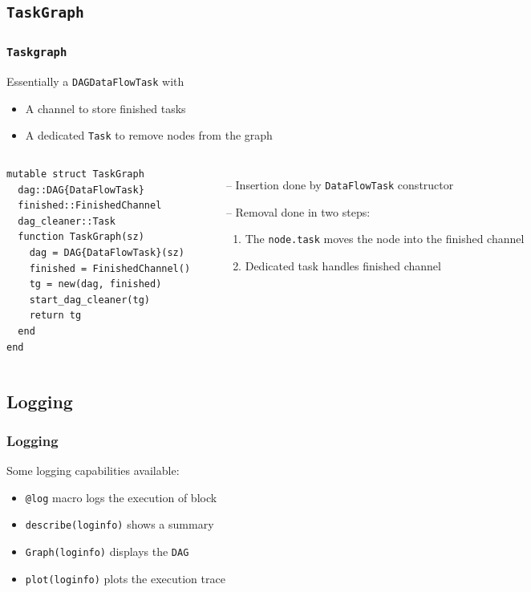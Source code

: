 \documentclass{beamer}
\begin{document}
\subsection{\texttt{TaskGraph}}

\begin{frame}[fragile]
\frametitle{{\texttt{Taskgraph}}}  
  
Essentially a \texttt{DAG{DataFlowTask}} with
\begin{itemize}
  \item A channel to store finished tasks  
  \item A dedicated \texttt{Task} to remove nodes from the graph
\end{itemize}

\hrulefill

\begin{columns}

\begin{verbatim}
mutable struct TaskGraph
  dag::DAG{DataFlowTask}
  finished::FinishedChannel
  dag_cleaner::Task
  function TaskGraph(sz)
    dag = DAG{DataFlowTask}(sz)
    finished = FinishedChannel()
    tg = new(dag, finished)
    start_dag_cleaner(tg)
    return tg
  end
end
\end{verbatim}

\begin{itemize}
  \item[--] Insertion done by \texttt{DataFlowTask} constructor
  \item[--] Removal done in two steps:
  \begin{enumerate}
    \item The \texttt{node.task} moves the node into the finished channel
    \item Dedicated task handles finished channel
  \end{enumerate}
\end{itemize}  

\end{columns}

\end{frame}

\subsection{Logging}

\begin{frame}
\frametitle{Logging}

Some logging capabilities available:
\begin{itemize}
  \item \texttt{@log} macro logs the execution of block
  \item \texttt{describe(loginfo)} shows a summary
  \item \texttt{Graph(loginfo)} displays the \texttt{DAG}
  \item \texttt{plot(loginfo)} plots the execution trace
\end{itemize}

\end{frame}
\end{document}
